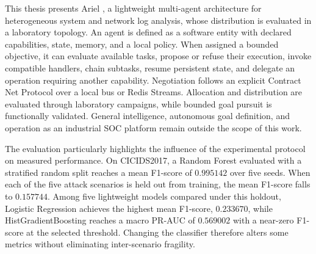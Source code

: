 
This thesis presents Ariel \logminer{}, a lightweight multi-agent architecture
for heterogeneous system and network log analysis, whose distribution is
evaluated in a laboratory topology. An agent is defined as a software entity
with declared capabilities, state, memory, and a local policy. When assigned
a bounded objective, it can evaluate available tasks, propose or refuse their
execution, invoke compatible handlers, chain subtasks, resume persistent state,
and delegate an operation requiring another capability. Negotiation follows an
explicit Contract Net Protocol over a local bus or Redis Streams. Allocation
and distribution are evaluated through laboratory campaigns, while bounded
goal pursuit is functionally validated. General intelligence, autonomous goal
definition, and operation as an industrial SOC platform remain outside the
scope of this work.

The evaluation particularly highlights the influence of the experimental
protocol on measured performance. On CICIDS2017, a Random Forest evaluated
with a stratified random split reaches a mean F1-score of $0.995142$ over five
seeds. When each of the five attack scenarios is held out from training, the
mean F1-score falls to $0.157744$. Among five lightweight models compared
under this holdout, Logistic Regression achieves the highest mean F1-score,
$0.233670$, while HistGradientBoosting reaches a macro PR-AUC of $0.569002$
with a near-zero F1-score at the selected threshold. Changing the classifier
therefore alters some metrics without eliminating inter-scenario fragility.

